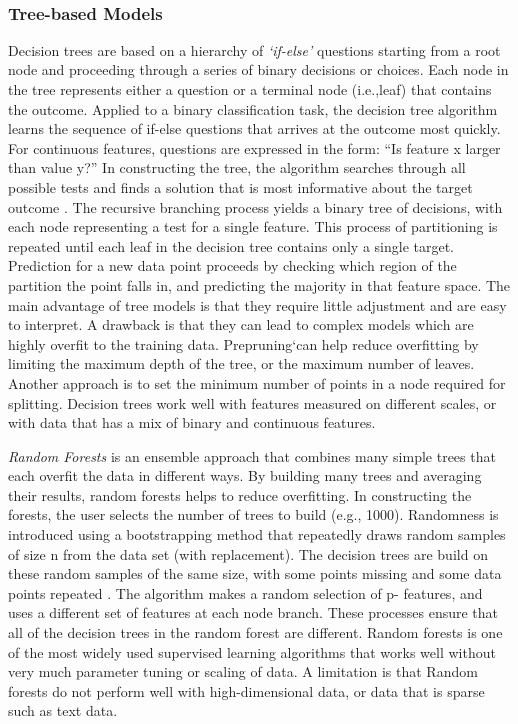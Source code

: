 \\\documentclass[sigconf]{acmart}
\begin{document}
\subsubsection{Tree-based Models} Decision trees are based on a hierarchy of 
\emph{`if-else'} questions starting from a root node and proceeding through a 
series of binary decisions or choices. Each node in the tree represents either 
a question or a terminal node (i.e.,leaf) that contains the outcome. Applied to 
a binary classification task, the decision tree algorithm learns the sequence
of if-else questions that arrives at the outcome most quickly. For continuous 
features, questions are expressed in the form: ``Is feature x larger than 
value y?'' In constructing the tree, the algorithm searches through all 
possible tests and finds a solution that is most informative about the target 
outcome \cite{muller17}. The recursive branching process yields a binary tree 
of decisions, with each node representing a test for a single feature. This 
process of partitioning is repeated until each leaf in the decision tree 
contains only a single target. Prediction for a new data point proceeds by 
checking which region of the partition the point falls in, and predicting the 
majority in that feature space. The main advantage of tree models is that they 
require little adjustment and are easy to interpret. A drawback is that they 
can lead to complex models which are highly overfit to the training data. 
Prepruning`can help reduce overfitting by limiting the maximum depth of the 
tree, or the maximum number of leaves. Another approach is to set the minimum 
number of points in a node required for splitting. Decision trees work well 
with features measured on different scales, or with data that has a mix of 
binary and continuous features. 


\emph{Random Forests} is an ensemble approach that combines many simple trees 
that each overfit the data in different ways. By building many trees and 
averaging their results, random forests helps to reduce overfitting. In 
constructing the forests, the user selects the number of trees to build 
(e.g., 1000). Randomness is introduced using a bootstrapping method that 
repeatedly draws random samples of size n from the data set (with replacement).  
The decision trees are build on these random samples of the same size, with 
some points missing and some data points repeated \cite{muller17,raschka17}.
The algorithm makes a random selection of p- features, and uses a different 
set of features at each node branch. These processes ensure that all of the 
decision trees in the random forest are different. Random forests is one of 
the most widely used supervised learning algorithms that works well without 
very much parameter tuning or scaling of data. A limitation is that Random 
forests do not perform well with high-dimensional data, or data that is 
sparse such as text data.
\end{document}
